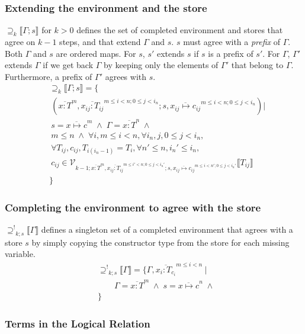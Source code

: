 \documentclass[9pt]{sigplanconf}
\newcommand{\gap}{\quad\quad}
\newcommand{\seq}[1]{\overline{#1}}
\newcommand{\relv}[4]{\mathcal{V}_{#1;#2;#3}\llbracket#4\rrbracket}
\newcommand{\rels}[3]{\mathcal{\supseteq}_{#1}\llbracket#2;#3\rrbracket}
\newcommand{\relg}[3]{\mathcal{\supseteq^!}_{#1;#2}\llbracket#3\rrbracket}
\newcommand{\andl}{\;\wedge\;}
\begin{document}
\subsubsection{Extending the environment and the store}
$\rels k \Gamma s$ for $k > 0$ defines the set of completed
environment and stores that agree on $k-1$ steps, and that extend
$\Gamma$ and $s$. $s$ must agree with a {\it prefix} of $\Gamma$.
Both $\Gamma$ and $s$ are ordered maps. For $s$, $s'$ extends $s$ if
$s$ is a prefix of $s'$. For $\Gamma$, $\Gamma'$ extends $\Gamma$ if
we get back $\Gamma$ by keeping only the elements of $\Gamma'$ that
belong to $\Gamma$. Furthermore, a prefix of $\Gamma'$ agrees with
$s$.
\begin{align*}
&\rels k \Gamma s = \{\\
&\ (\seq{x : T}^m, \seq{x_{ij} : T_{ij}}^{m \leq i < n; 0 \leq j < i_n}; s, \seq{x_{ij} \mapsto c_{ij}}^{m \leq i < n; 0 \leq j < i_n}) |\\
&\ s = \seq{x \mapsto c}^m \andl \Gamma = \seq{x : T}^n \andl \\
&\ m\leq n \andl \forall i, m \leq i < n, \forall {i_n}, j, 0 \leq j < i_n,\\
&\ \forall T_{ij}, c_{ij}, T_{i{(i_n-1)}} = T_i, \forall n' \leq n, i_n' \leq i_n,\\
&\ c_{ij} \in \relv {k-1} {\seq{x : T}^m, \seq{x_{ij} : T_{ij}}^{m \leq i' < n; 0 \leq j < i_n'}} {s, \seq{x_{ij} \mapsto c_{ij}}^{m \leq i < n'; 0 \leq j < i_n'}} {T_{ij}}\\
&\}
\end{align*}

\subsubsection{Completing the environment to agree with the store}
$\relg k s \Gamma$ defines a singleton set of a completed environment
that agrees with a store $s$ by simply copying the constructor type
from the store for each missing variable.
\begin{align*}
&\relg k s \Gamma = \{ \Gamma, \seq{x_i : T_{c_i}}^{m \leq i < n} \ |\\
&\gap \Gamma = \seq{x : T}^m \andl s = \seq{x \mapsto c}^n \andl\\
&\}
\end{align*}

\subsubsection{Terms in the Logical Relation}
\end{document}
